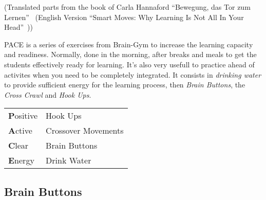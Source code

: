 \documentclass[../main.tex]{subfiles}
\begin{document}
\label{Ex:PACE}

(Translated parts from the book of Carla Hannaford ``Bewegung, das Tor zum Lernen''~\cite{BraingymD} (English Version ``Smart Moves: Why Learning Is Not All In Your Head''~\cite{BraingymE}))

\vspace{1cm}
PACE is a series of exercises from Brain-Gym  to increase the learning capacity and readiness.
Normally, done in the morning, after breaks and meals to get the students effectively ready for learning.
It's also very usefull to practice ahead of activites when you need to be completely integrated.
It consists in \emph{drinking water} to provide sufficient energy for the learning process, then \emph{Brain Buttons}, the \emph{Cross Crawl} and \emph{Hook Ups}.


\vspace{1cm}
\begin{tabular}{ll}
\textbf{P}ositive & Hook Ups\\
\textbf{A}ctive & Crossover Movements\\
\textbf{C}lear & Brain Buttons\\
\textbf{E}nergy & Drink Water\\
\end{tabular}

\subsection{Brain Buttons}
\end{document}
